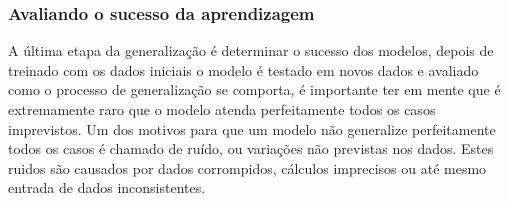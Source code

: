 \subsubsection{Avaliando o sucesso da aprendizagem}
\label{cap:avaliando-generalização-dados}
A última etapa da generalização é determinar o sucesso dos modelos, depois de treinado com os dados iniciais
o modelo é testado em novos dados e avaliado como o processo de generalização se comporta, é importante ter em mente que é extremamente raro
que o modelo atenda perfeitamente todos os casos imprevistos.
Um dos motivos para que um modelo não generalize perfeitamente todos os casos é chamado de ruído, ou variações não previstas nos dados.
Estes ruidos são causados por dados corrompidos, cálculos imprecisos ou até mesmo entrada de dados inconsistentes.









 